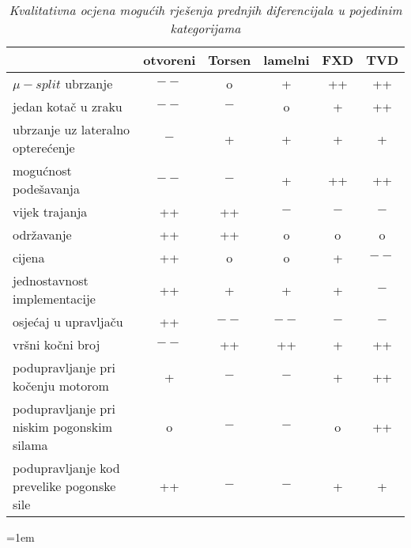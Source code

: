 \documentclass[11pt]{article}
\numberwithin{equation}{section}%
\begin{document}
\begin{table}[hb]
	\centering
	\begin{tabular}{lccccc}
	\toprule
		 & otvoreni & Torsen & lamelni & FXD & TVD\\
		\midrule
		 $\mu -split$ ubrzanje & $--$ & o & + & ++ & ++\\
		 jedan kotač u zraku & $--$ & $-$ & o & + & ++\\
		 ubrzanje uz lateralno opterećenje & $-$ & + & + & + & +\\
		mogućnost podešavanja & $--$ & $-$ & + & ++ & ++\\
		vijek trajanja & ++ & ++ & $-$ & $-$ & $-$\\
		održavanje & ++ & ++ & o & o & o\\
		cijena & ++ & o & o & + & $- -$\\
		jednostavnost implementacije & ++ & + & + & + & $-$\\
		osjećaj u upravljaču & ++ & $--$ & $--$ & $-$ & $-$\\
		vršni kočni broj & $--$ & ++ & ++ & + & ++\\
		podupravljanje pri kočenju motorom & + & $-$ & $-$ & + & ++\\
		podupravljanje pri niskim pogonskim silama & o & $-$ & $-$ & o & ++\\
		podupravljanje kod prevelike pogonske sile & ++ & $-$ & $-$ & + & +\\
		\bottomrule
	\end{tabular}
	\caption{\textit{Kvalitativna ocjena mogućih rješenja prednjih diferencijala u pojedinim kategorijama}}
	\label{tab4}
\end{table}
\newpage
% 
% 
% 
% 

\newpage
{}
\emergencystretch=1em%
\printbibliography
\end{document}
